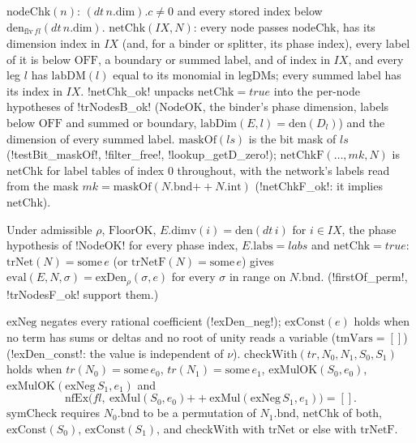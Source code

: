 \begin{definition}
$\mathrm{nodeChk}(n)$: $(\mathit{dt}\,n.\mathrm{dim}).c\neq0$ and every stored index below $\mathrm{den}_{\mathrm{flv}\,\mathit{fl}}(\mathit{dt}\,n.\mathrm{dim})$. $\mathrm{netChk}(\mathit{IX},N)$: every node passes $\mathrm{nodeChk}$, has its dimension index in $\mathit{IX}$ (and, for a binder or splitter, its phase index), every label of it is below $\mathrm{OFF}$, a boundary or summed label, and of index in $\mathit{IX}$, and every leg $l$ has $\mathrm{labDM}(l)$ equal to its monomial in $\mathrm{legDMs}$; every summed label has its index in $\mathit{IX}$. \lean!netChk_ok! unpacks $\mathrm{netChk}=\mathit{true}$ into the per-node hypotheses of \lean!trNodesB_ok! ($\mathrm{NodeOK}$, the binder's phase dimension, labels below $\mathrm{OFF}$ and summed or boundary, $\mathrm{labDim}(E,l)=\mathrm{den}(D_l)$) and the dimension of every summed label. $\mathrm{maskOf}(ls)$ is the bit mask of $ls$ (\lean!testBit_maskOf!, \lean!filter_free!, \lean!lookup_getD_zero!); $\mathrm{netChkF}(\ldots,\mathit{mk},N)$ is $\mathrm{netChk}$ for label tables of index $0$ throughout, with the network's labels read from the mask $\mathit{mk}=\mathrm{maskOf}(N.\mathrm{bnd}\mathbin{+\!\!+}N.\mathrm{int})$ (\lean!netChkF_ok!: it implies $\mathrm{netChk}$).
\end{definition}

\begin{theorem}
Under admissible $\rho$, $\mathrm{FloorOK}$, $E.\mathrm{dimv}(i)=\mathrm{den}(\mathit{dt}\,i)$ for $i\in\mathit{IX}$, the phase hypothesis of \lean!NodeOK! for every phase index, $E.\mathrm{labs}=\mathit{labs}$ and $\mathrm{netChk}=\mathit{true}$: $\mathrm{trNet}(N)=\mathrm{some}\,e$ (or $\mathrm{trNetF}(N)=\mathrm{some}\,e$) gives $\mathrm{eval}(E,N,\sigma)=\mathrm{exDen}_\rho(\sigma,e)$ for every $\sigma$ in range on $N.\mathrm{bnd}$. (\lean!firstOf_perm!, \lean!trNodesF_ok! support them.)
\end{theorem}

\begin{definition}
$\mathrm{exNeg}$ negates every rational coefficient (\lean!exDen_neg!); $\mathrm{exConst}(e)$ holds when no term has sums or deltas and no root of unity reads a variable ($\mathrm{tmVars}=[]$) (\lean!exDen_const!: the value is independent of $\nu$). $\mathrm{checkWith}(\mathit{tr},N_0,N_1,S_0,S_1)$ holds when $\mathit{tr}(N_0)=\mathrm{some}\,e_0$, $\mathit{tr}(N_1)=\mathrm{some}\,e_1$, $\mathrm{exMulOK}(S_0,e_0)$, $\mathrm{exMulOK}(\mathrm{exNeg}\,S_1,e_1)$ and
\[
\mathrm{nfEx}\bigl(\mathit{fl},\ \mathrm{exMul}(S_0,e_0)\mathbin{+\!\!+}\mathrm{exMul}(\mathrm{exNeg}\,S_1,e_1)\bigr)=[].
\]
$\mathrm{symCheck}$ requires $N_0.\mathrm{bnd}$ to be a permutation of $N_1.\mathrm{bnd}$, $\mathrm{netChk}$ of both, $\mathrm{exConst}(S_0)$, $\mathrm{exConst}(S_1)$, and $\mathrm{checkWith}$ with $\mathrm{trNet}$ or else with $\mathrm{trNetF}$.
\end{definition}

